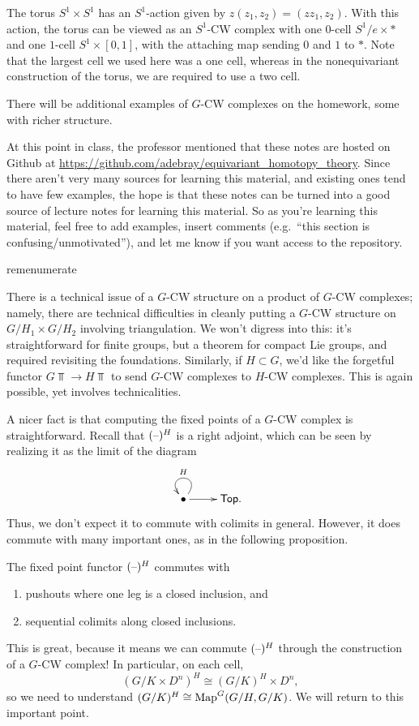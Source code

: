 \begin{exm}
The torus $S^1 \times S^1$ has an $S^1$-action given by $z(z_1, z_2) = (zz_1, z_2)$. With this action, the torus
can be viewed as an $S^1$-CW complex with one $0$-cell $S^1/e \times *$ and one $1$-cell $S^1 \times [0,1]$, with
the attaching map sending $0$ and $1$ to $*$. Note that the largest cell we used here was a one cell, whereas in the nonequivariant construction of the torus, we are required to use a two cell. 
\end{exm}
There will be additional examples of $G$-CW complexes on the homework, some with richer structure.
\begin{rem}
At this point in class, the professor mentioned that these notes are hosted on Github at
\url{https://github.com/adebray/equivariant_homotopy_theory}. Since there aren't very many sources for learning
this material, and existing ones tend to have few examples, the hope is that these notes can be turned into a good
source of lecture notes for learning this material. So as you're learning this material, feel free to add
examples, insert comments (e.g.\ ``this section is confusing/unmotivated''), and let me know if you want access to
the repository.
\end{rem}
\begin{comp}{rem}{enumerate}
	\item There is a technical issue of a $G$-CW structure on a product of $G$-CW complexes; namely, there are
	technical difficulties in cleanly putting a $G$-CW structure on $G/H_1\times G/H_2$ involving triangulation.
	We won't digress into this: it's straightforward for finite groups, but a theorem for compact Lie groups, and
	required revisiting the foundations. Similarly, if $H\subset G$, we'd like the forgetful functor $G\Top\to
	H\Top$ to send $G$-CW complexes to $H$-CW complexes. This is again possible, yet involves technicalities.
	\item A nicer fact is that computing the fixed points of a $G$-CW complex is straightforward. Recall that
	$(\text{--})^H$ is a right adjoint, which can be seen by realizing it as the limit of the diagram
	\[\xymatrix{
		\bullet\ar@(ur, ul)_H\ar[r] & \Top.
	}\]
	Thus, we don't expect it to commute with colimits in general. However, it does commute with many important
	ones, as in the following proposition.\qedhere
\end{comp}
\begin{prop}
The fixed point functor $(\text{--})^H$ commutes with
\begin{enumerate}
	\item pushouts where one leg is a closed inclusion, and
	\item sequential colimits along closed inclusions.
\end{enumerate}
\end{prop}
This is great, because it means we can commute $(\text{--})^H$ through the construction of a $G$-CW complex! In
particular, on each cell,
\[(G/K\times D^n)^H\cong (G/K)^H\times D^n,\]
so we need to understand $(G/K)^H\cong\operatorname{Map}^G(G/H,G/K)$. We will return to this important point.
